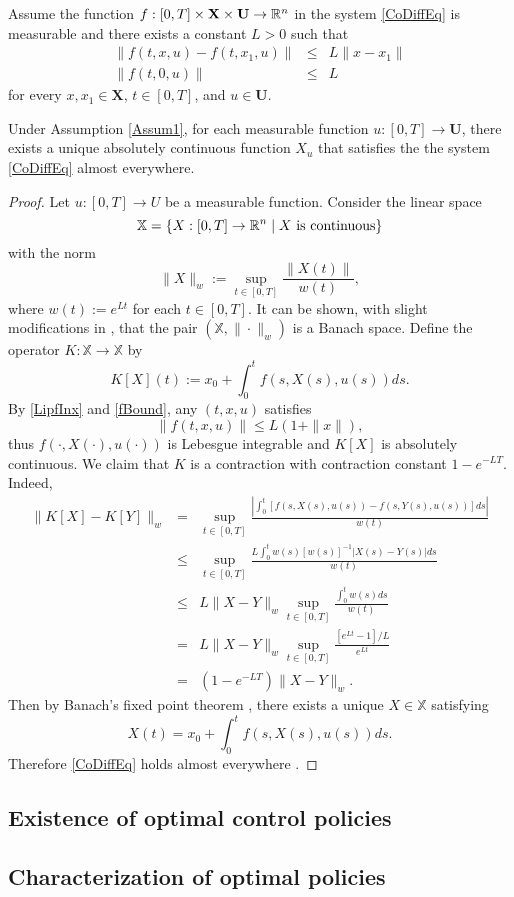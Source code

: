 \begin{theorem}\label{ExAdmisPair} Assume the function $f:[0,T]\times \mathbf{X}\times \mathbf{U}\to \mathbb{R}^n$ in the system \eqref{CoDiffEq} is measurable and there exists a constant $L>0$ such that
\begin{eqnarray}
  \|f(t,x,u)-f(t,x_1,u)\| & \leq & L\|x-x_1\|\label{LipfInx}\\
  \|f(t,0,u)\| & \leq & L\label{fBound}
\end{eqnarray}
for every $x,x_1\in \mathbf{X}$, $t\in[0,T]$, and $u\in \mathbf{U}$.

	Under Assumption \ref{Assum1}, for each measurable function 
	$u:[0,T]\to \mathbf{U}$, there exists a unique absolutely continuous function $X_u$ that satisfies the the system 
	\eqref{CoDiffEq} almost everywhere. %
\end{theorem}
\begin{proof} Let $u:[0,T]\to U$ be a measurable function. Consider the linear space 
    \[\mathbb{X}=\{X:[0,T]\to \mathbb{R}^n\mid X \mbox{ is continuous}\}\] 
with the norm
    \[ \|X\|_w:=\sup_{t\in[0,T]} \frac{\|X(t)\|}{w(t)}, \]
where $w(t):=e^{Lt}$ for each $t\in [0,T]$. It can be shown, with slight modifications in \cite[Section 2.1]{Teschl}, that the pair $(\mathbb{X},\|\cdot\|_w)$ is a Banach space. Define the operator $K:\mathbb{X}\to \mathbb{X}$ by 
    \[ K[X](t):=x_0 + \int_0^t f(s,X(s),u(s))ds.\]
By \eqref{LipfInx} and \eqref{fBound}, any $(t,x,u)$ satisfies 
  \begin{equation}
      \|f(t,x,u)\| \leq  L(1+\|x\|),
  \end{equation}
thus $f(\cdot,X(\cdot),u(\cdot))$ is Lebesgue integrable and $K[X]$ is absolutely continuous. We claim that $K$ is a contraction with contraction constant $1-e^{-LT}$. Indeed,
    \begin{eqnarray*}
    \| K[X] - K[Y] \|_w & = & \sup_{t\in[0,T]} \frac{|\int_0^t [f(s,X(s),u(s)) -f(s,Y(s),u(s))]ds|}{w(t)}\\
        & \leq &   \sup_{t\in[0,T]} \frac{L\int_0^t w(s)[w(s)]^{-1}|X(s) -Y(s)|ds}{w(t)}\\
        &\leq &  L\|X-Y\|_w \sup_{t\in[0,T]} \frac{\int_0^t w(s)ds}{w(t)}\\
        & = &  L\|X-Y\|_w \sup_{t\in[0,T]}\frac{[e^{Lt}-1]/L}{e^{Lt}}\\
        & = &  (1-e^{-LT})\|X-Y\|_w. 
    \end{eqnarray*}
Then by Banach's fixed point theorem \cite[Theorem 2.1]{Teschl}, there exists a unique $X\in \mathbb{X}$ satisfying 
    \[ X(t)=x_0 + \int_0^t f(s,X(s),u(s))ds.\]
Therefore \eqref{CoDiffEq} holds almost everywhere \cite[Corollary 5.4.1]{Loeb2016}.
\end{proof}



\subsection{Existence of optimal control policies}



\subsection{Characterization of optimal policies}
